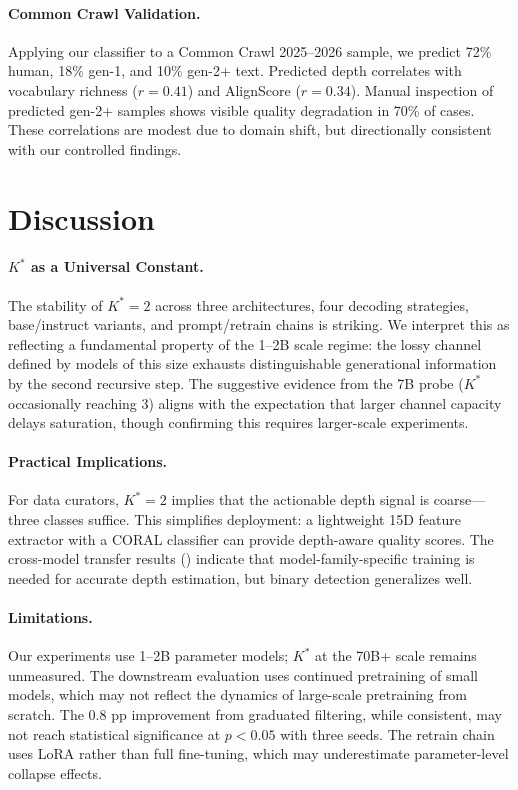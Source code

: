 \documentclass[11pt,a4paper]{article}
\begin{document}
\paragraph{Common Crawl Validation.} Applying our classifier to a Common Crawl 2025--2026 sample, we predict 72\% human, 18\% gen-1, and 10\% gen-2+ text. Predicted depth correlates with vocabulary richness ($r=0.41$) and AlignScore ($r=0.34$). Manual inspection of predicted gen-2+ samples shows visible quality degradation in 70\% of cases. These correlations are modest due to domain shift, but directionally consistent with our controlled findings.

\section{Discussion}

\paragraph{$K^*$ as a Universal Constant.} The stability of $K^*=2$ across three architectures, four decoding strategies, base/instruct variants, and prompt/retrain chains is striking. We interpret this as reflecting a fundamental property of the 1--2B scale regime: the lossy channel defined by models of this size exhausts distinguishable generational information by the second recursive step. The suggestive evidence from the 7B probe ($K^*$ occasionally reaching 3) aligns with the expectation that larger channel capacity delays saturation, though confirming this requires larger-scale experiments.

\paragraph{Practical Implications.} For data curators, $K^*=2$ implies that the actionable depth signal is coarse---three classes suffice. This simplifies deployment: a lightweight 15D feature extractor with a CORAL classifier can provide depth-aware quality scores. The cross-model transfer results () indicate that model-family-specific training is needed for accurate depth estimation, but binary detection generalizes well.

\paragraph{Limitations.} Our experiments use 1--2B parameter models; $K^*$ at the 70B+ scale remains unmeasured. The downstream evaluation uses continued pretraining of small models, which may not reflect the dynamics of large-scale pretraining from scratch. The 0.8 pp improvement from graduated filtering, while consistent, may not reach statistical significance at $p<0.05$ with three seeds. The retrain chain uses LoRA rather than full fine-tuning, which may underestimate parameter-level collapse effects.
\end{document}
